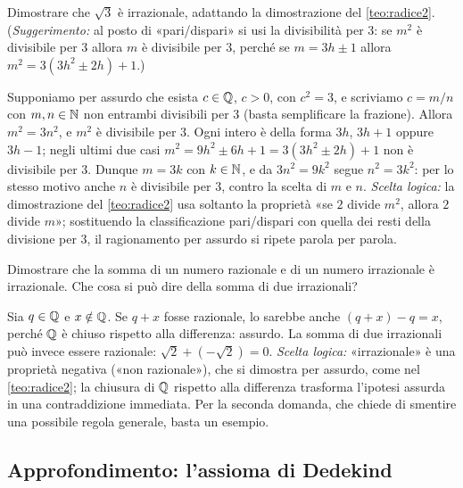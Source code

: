 \begin{esercizio}
Dimostrare che $\sqrt3$ è irrazionale, adattando la dimostrazione del
\cref{teo:radice2}. (\emph{Suggerimento:} al posto di «pari/dispari» si usi la
divisibilità per $3$: se $m^{2}$ è divisibile per $3$ allora $m$ è divisibile per $3$,
perché se $m=3h\pm1$ allora $m^{2}=3(3h^{2}\pm2h)+1$.)
\begin{soluzione}
Supponiamo per assurdo che esista $c\in\mathbb{Q}$, $c>0$, con $c^{2}=3$, e scriviamo
$c=m/n$ con $m,n\in\mathbb{N}$ non entrambi divisibili per $3$ (basta semplificare la
frazione). Allora $m^{2}=3n^{2}$, e $m^{2}$ è divisibile per $3$. Ogni intero è della
forma $3h$, $3h+1$ oppure $3h-1$; negli ultimi due casi
$m^{2}=9h^{2}\pm6h+1=3(3h^{2}\pm2h)+1$ non è divisibile per $3$. Dunque $m=3k$ con
$k\in\mathbb{N}$, e da $3n^{2}=9k^{2}$ segue $n^{2}=3k^{2}$: per lo stesso motivo anche $n$ è
divisibile per $3$, contro la scelta di $m$ e $n$. \emph{Scelta logica:} la
dimostrazione del \cref{teo:radice2} usa soltanto la proprietà «se $2$ divide $m^{2}$,
allora $2$ divide $m$»; sostituendo la classificazione pari/dispari con quella dei resti
della divisione per $3$, il ragionamento per assurdo si ripete parola per parola.
\end{soluzione}
\end{esercizio}

\begin{esercizio}
Dimostrare che la somma di un numero razionale e di un numero irrazionale è irrazionale.
Che cosa si può dire della somma di due irrazionali?
\begin{soluzione}
Sia $q\in\mathbb{Q}$ e $x\notin\mathbb{Q}$. Se $q+x$ fosse razionale, lo sarebbe anche
$(q+x)-q=x$, perché $\mathbb{Q}$ è chiuso rispetto alla differenza: assurdo. La somma di due
irrazionali può invece essere razionale: $\sqrt2+(-\sqrt2)=0$. \emph{Scelta logica:}
«irrazionale» è una proprietà negativa («non razionale»), che si dimostra per assurdo,
come nel \cref{teo:radice2}; la chiusura di $\mathbb{Q}$ rispetto alla differenza trasforma
l'ipotesi assurda in una contraddizione immediata. Per la seconda domanda, che chiede di
smentire una possibile regola generale, basta un esempio.
\end{soluzione}
\end{esercizio}

\subsection{Approfondimento: l'assioma di Dedekind}
\label{subsec:assioma-dedekind}

